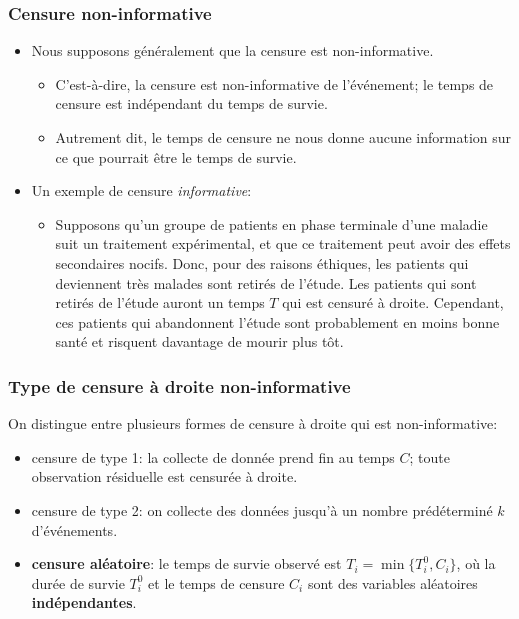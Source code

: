 \documentclass{beamer}
\begin{document}
\begin{frame}
\frametitle{Censure non-informative}
\begin{itemize}
\item Nous supposons généralement que la censure est \alert{non-informative}. 
\begin{itemize}
\vp \vp
\item C'est-à-dire, la censure est non-informative de l'événement; le temps de censure est indépendant du temps de survie.
\item Autrement dit, le temps de censure ne nous donne aucune information sur ce que pourrait être le temps de survie.
\end{itemize}
\item Un exemple de censure \emph{informative}:
\begin{itemize}
\vp \vp
\item Supposons qu'un groupe de patients en phase terminale d'une maladie suit un traitement expérimental, et que ce traitement peut avoir des effets secondaires nocifs. Donc, pour des raisons éthiques, les patients qui deviennent très malades sont retirés de l'étude. Les patients qui sont retirés de l'étude auront un temps $T$ qui est censuré à droite. Cependant, ces patients qui abandonnent l'étude sont probablement en moins bonne santé et risquent davantage de mourir plus tôt.
\end{itemize}
\end{itemize}
\end{frame}
\begin{frame}
\frametitle{Type de censure à droite non-informative}
 On distingue entre plusieurs formes de censure à droite qui est non-informative:
 \begin{itemize} \item censure de type 1: la collecte de donnée prend fin au temps $C$; toute observation résiduelle est censurée à droite.
 \item censure de type 2: on collecte des données jusqu'à un nombre prédéterminé $k$ d'événements.
 \item \textbf{censure aléatoire}: le temps de survie observé est $T_i = \min\{T_i^0, C_i\}$, où la durée de survie $T_i^0$ et le temps de censure $C_i$ sont des variables aléatoires \textbf{indépendantes}. 
 \end{itemize}

\end{frame}
\end{document}
